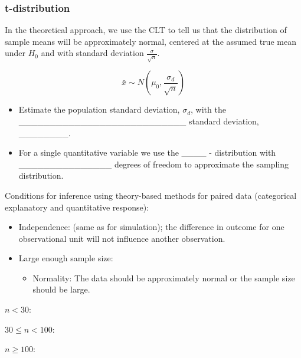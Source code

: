 \documentclass[
]{report}
\providecommand{\tightlist}{%
  \setlength{\itemsep}{0pt}\setlength{\parskip}{0pt}}
\newcommand{\rgi}{\hspace{24pt}}  %
\begin{document}
\subsubsection*{t-distribution}\label{t-distribution-1}

In the theoretical approach, we use the CLT to tell us that the distribution of sample means will be approximately normal, centered at the assumed true mean under \(H_0\) and with standard deviation \(\frac{\sigma}{\sqrt{n}}\).

\[\bar{x} \sim N(\mu_0, \frac{\sigma_d}{\sqrt{n}})\]

\begin{itemize}
\item
  Estimate the population standard deviation, \(\sigma_d\), with the
  \_\_\_\_\_\_\_\_\_\_\_\_\_\_\_\_\_\_\_\_\_\_\_\_\_\_\_ standard deviation, \_\_\_\_\_\_\_\_.
\item
  For a single quantitative variable we use the \_\_\_\_ - distribution
  with \_\_\_\_\_\_\_\_\_\_\_\_\_\_\_
  degrees of freedom to approximate the sampling distribution.
\end{itemize}


Conditions for inference using theory-based methods for paired data (categorical explanatory and quantitative response):

\begin{itemize}
\item
  Independence: (same as for simulation); the difference in outcome for one observational unit will not influence another observation.
\item
  Large enough sample size:

  \begin{itemize}
  \tightlist
  \item
    Normality: The data should be approximately normal or the sample size should be large.
  \end{itemize}
\end{itemize}

\rgi \rgi \(n < 30\):

\vspace{0.2in}

\rgi \rgi \(30 \leq n < 100\):

\vspace{0.2in}

\rgi \rgi \(n \geq 100\):

\vspace{0.2in}
\end{document}
